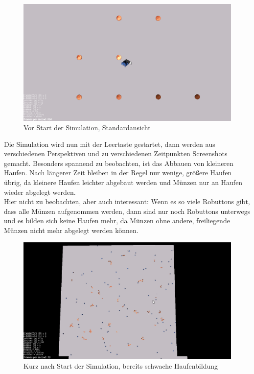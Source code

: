 \begin{figure}[h]
 \centering
 \includegraphics[width=\textwidth,height=.62\textwidth]{3d/2StandardAnsicht.png}
 \caption{Vor Start der Simulation, Standardansicht}
\end{figure}
\newline
Die Simulation wird nun mit der Leertaste gestartet, dann werden aus verschiedenen
Perspektiven und zu verschiedenen Zeitpunkten Screenshots gemacht.
Besonders spannend zu beobachten, ist das Abbauen von kleineren Haufen. Nach längerer Zeit bleiben in der Regel
nur wenige, größere Haufen übrig, da kleinere Haufen leichter abgebaut werden und Münzen nur an Haufen wieder
abgelegt werden. \\
Hier nicht zu beobachten, aber auch interessant: Wenn es so viele Robuttons gibt, dass alle Münzen
aufgenommen werden, dann sind nur noch Robuttons unterwegs und es bilden sich keine Haufen mehr, da
Münzen ohne andere, freiliegende Münzen nicht mehr abgelegt werden können.
\begin{figure}[ht]
 \centering
 \includegraphics[width=\textwidth,height=.56\textwidth]{3d/3.png}
 \caption{Kurz nach Start der Simulation, bereits schwache Haufenbildung}
\end{figure}
